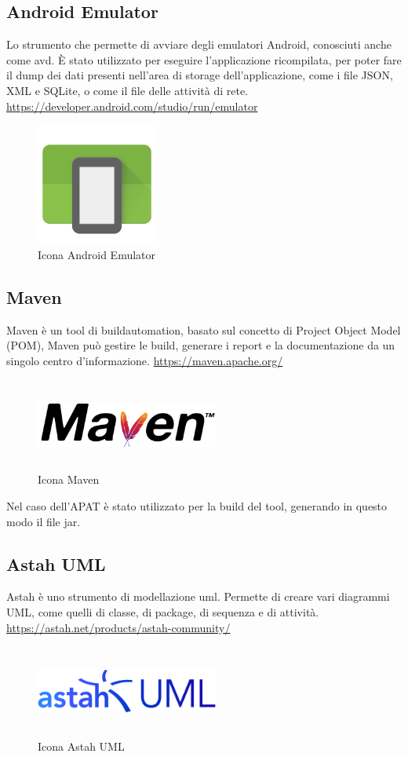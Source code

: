 \subsection*{Android Emulator}
Lo strumento che permette di avviare degli emulatori Android, conosciuti anche come \gls{avd}.
È stato utilizzato per eseguire l'applicazione ricompilata, per poter fare il dump dei dati presenti nell'area di storage dell'applicazione, come i file JSON, XML e SQLite, o come il file delle attività di rete.
\url{https://developer.android.com/studio/run/emulator}
\begin{figure}[H]
    \centering
    \includegraphics[width=4cm, height=4cm]{./immagini/emulator.png}
    \caption{Icona Android Emulator}\label{fig:emulator}
\end{figure}

\subsection*{Maven}
Maven è un tool di \gls{buildautomation}, basato sul concetto di Project Object Model (POM), Maven può gestire le build, generare i report e la documentazione da un singolo centro d'informazione.
\url{https://maven.apache.org/}
\begin{figure}[H]
    \centering
    \includegraphics[width=6cm, height=3cm]{./immagini/maven.png}
    \caption{Icona Maven}\label{fig:maven}
\end{figure}
Nel caso dell'APAT è stato utilizzato per la build del tool, generando in questo modo il file jar.

\subsection*{Astah UML}
Astah è uno strumento di modellazione \gls{uml}. Permette di creare vari diagrammi UML, come quelli di classe, di package, di sequenza e di attività.
\url{https://astah.net/products/astah-community/}
\begin{figure}[H]
    \centering
    \includegraphics[width=6cm, height=3cm]{./immagini/astah.png}
    \caption{Icona Astah UML}\label{fig:astah}
\end{figure}

